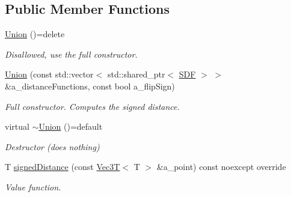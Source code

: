 \subsection*{Public Member Functions}
\begin{DoxyCompactItemize}
\item 
\mbox{\label{classUnion_a2dea7d7ed6d5456f87feff0e02c99453}} 
\hyperlink{classUnion_a2dea7d7ed6d5456f87feff0e02c99453}{Union} ()=delete
\begin{DoxyCompactList}\small\item\em Disallowed, use the full constructor. \end{DoxyCompactList}\item 
\hyperlink{classUnion_a7f1a9e850f8965dc35e221b23a55e451}{Union} (const std\+::vector$<$ std\+::shared\+\_\+ptr$<$ \hyperlink{classUnion_a9e9d1d95ae54fa471c6f29e778239021}{S\+DF} $>$ $>$ \&a\+\_\+distance\+Functions, const bool a\+\_\+flip\+Sign)
\begin{DoxyCompactList}\small\item\em Full constructor. Computes the signed distance. \end{DoxyCompactList}\item 
\mbox{\label{classUnion_a5c4f15da1b35f6f6643d49ed18faa386}} 
virtual \hyperlink{classUnion_a5c4f15da1b35f6f6643d49ed18faa386}{$\sim$\+Union} ()=default
\begin{DoxyCompactList}\small\item\em Destructor (does nothing) \end{DoxyCompactList}\item 
T \hyperlink{classUnion_a08beffd354ca261e3d31bcb453951810}{signed\+Distance} (const \hyperlink{classVec3T}{Vec3T}$<$ T $>$ \&a\+\_\+point) const noexcept override
\begin{DoxyCompactList}\small\item\em Value function. \end{DoxyCompactList}\end{DoxyCompactItemize}
